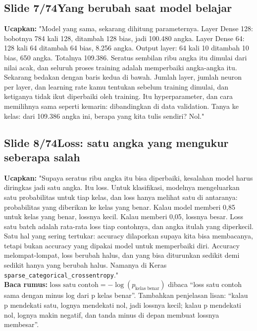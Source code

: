 \documentclass[11pt]{article}
\renewcommand{\framebox}[1]{\colorbox{acc!15}{\textcolor{acc}{\textbf{#1}}}}
\begin{document}
\subsection*{\framebox{Slide 7/74}\quad Yang berubah saat model belajar}
\textbf{Ucapkan:} "Model yang sama, sekarang dihitung parameternya. Layer Dense 128: bobotnya 784 kali 128, ditambah 128 bias, jadi 100.480 angka. Layer Dense 64: 128 kali 64 ditambah 64 bias, 8.256 angka. Output layer: 64 kali 10 ditambah 10 bias, 650 angka. Totalnya 109.386. Seratus sembilan ribu angka itu dimulai dari nilai acak, dan seluruh proses training adalah memperbaiki angka-angka itu. Sekarang bedakan dengan baris kedua di bawah. Jumlah layer, jumlah neuron per layer, dan learning rate kamu tentukan sebelum training dimulai, dan ketiganya tidak ikut diperbaiki oleh training. Itu hyperparameter, dan cara memilihnya sama seperti kemarin: dibandingkan di data validation. Tanya ke kelas: dari 109.386 angka ini, berapa yang kita tulis sendiri? Nol."\\[2pt]

\subsection*{\framebox{Slide 8/74}\quad Loss: satu angka yang mengukur seberapa salah}
\textbf{Ucapkan:} "Supaya seratus ribu angka itu bisa diperbaiki, kesalahan model harus diringkas jadi satu angka. Itu loss. Untuk klasifikasi, modelnya mengeluarkan satu probabilitas untuk tiap kelas, dan loss hanya melihat satu di antaranya: probabilitas yang diberikan ke kelas yang benar. Kalau model memberi 0,85 untuk kelas yang benar, lossnya kecil. Kalau memberi 0,05, lossnya besar. Loss satu batch adalah rata-rata loss tiap contohnya, dan angka itulah yang diperkecil. Satu hal yang sering tertukar: accuracy dilaporkan supaya kita bisa membacanya, tetapi bukan accuracy yang dipakai model untuk memperbaiki diri. Accuracy melompat-lompat, loss berubah halus, dan yang bisa diturunkan sedikit demi sedikit hanya yang berubah halus. Namanya di Keras \texttt{sparse\_categorical\_crossentropy}."\\[2pt]
\textbf{Baca rumus:} $\text{loss satu contoh} = -\log\left(p_{\text{kelas benar}}\right)$ dibaca ``loss satu contoh sama dengan minus log dari p kelas benar''. Tambahkan penjelasan lisan: ``kalau p mendekati satu, lognya mendekati nol, jadi lossnya kecil; kalau p mendekati nol, lognya makin negatif, dan tanda minus di depan membuat lossnya membesar''.\\[2pt]
\end{document}
